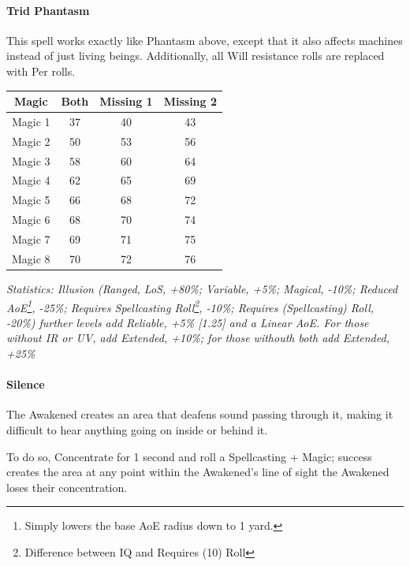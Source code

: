 \begin{multicols}{3}
	\paragraph{Trid Phantasm}
	
	This spell works exactly like Phantasm above, except that it also affects machines instead of just living beings. Additionally, all Will resistance rolls are replaced with Per rolls.
	
	\begin{center}
		\begin{adjustwidth}{-2.5mm}{}
		\begin{tabular}{|c|c|c|c|}
			\hline
			Magic & Both & Missing 1 & Missing 2 \\
			\hline
			\hline
			Magic 1 & 37 & 40 & 43 \\
			Magic 2 & 50 & 53 & 56 \\
			Magic 3 & 58 & 60 & 64 \\
			Magic 4 & 62 & 65 & 69 \\
			Magic 5 & 66 & 68 & 72 \\
			Magic 6 & 68 & 70 & 74 \\
			Magic 7 & 69 & 71 & 75 \\
			Magic 8 & 70 & 72 & 76 \\
			\hline
		\end{tabular}
		\end{adjustwidth}
	\end{center}
	
	\textcolor{OliveGreen}{\textit{Statistics: Illusion (Ranged, LoS, +80\%; Variable, +5\%; Magical, -10\%; Reduced AoE\footnote{Simply lowers the base AoE radius down to 1 yard.}, -25\%; Requires Spellcasting Roll\footnote{Difference between IQ and Requires (10) Roll}, -10\%; Requires (Spellcasting) Roll, -20\%) further levels add Reliable, +5\% [1.25] and a Linear AoE. For those without IR or UV, add Extended, +10\%; for those withouth both add Extended, +25\%}}
	
	\paragraph{Silence}
	
	The Awakened creates an area that deafens sound passing through it, making it difficult to hear anything going on inside or behind it.
	
	To do so, Concentrate for 1 second and roll a Spellcasting + Magic; success creates the area at any point within the Awakened's line of sight the Awakened loses their concentration.
	

\end{multicols}

